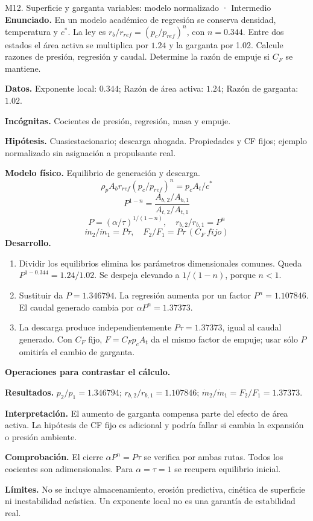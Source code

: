 \begin{studiumworked}{M12. Superficie y garganta variables: modelo normalizado · Intermedio}
\textbf{Enunciado.} En un modelo académico de regresión se conserva densidad, temperatura y $c^*$. La ley es $r_b/r_{ref}=(p_c/p_{ref})^n$, con $n=0.344$. Entre dos estados el área activa se multiplica por $1.24$ y la garganta por 1.02. Calcule razones de presión, regresión y caudal. Determine la razón de empuje si $C_F$ se mantiene.

\textbf{Datos.} Exponente local: $0.344$; Razón de área activa: $1.24$; Razón de garganta: $1.02$.

\textbf{Incógnitas.} Cocientes de presión, regresión, masa y empuje.

\textbf{Hipótesis.} Cuasiestacionario; descarga ahogada. Propiedades y CF fijos; ejemplo normalizado sin asignación a propulsante real.

\textbf{Modelo físico.} Equilibrio de generación y descarga.
\[\rho_pA_br_{ref}(p_c/p_{ref})^n=p_cA_t/c^*\]
\[P^{1-n}=\frac{A_{b,2}/A_{b,1}}{A_{t,2}/A_{t,1}}\]
\[P=(\alpha/\tau)^{1/(1-n)},\quad r_{b,2}/r_{b,1}=P^n\]
\[\dot m_2/\dot m_1=P\tau,\quad F_2/F_1=P\tau\ (C_F\ fijo)\]
\textbf{Desarrollo.}
\begin{enumerate}
\item Dividir los equilibrios elimina los parámetros dimensionales comunes. Queda $P^{1-0.344}=1.24/1.02$. Se despeja elevando a $1/(1-n)$, porque $n<1$.
\item Sustituir da $P=1.346794$. La regresión aumenta por un factor $P^n=1.107846$. El caudal generado cambia por $\alpha P^n=1.37373$.
\item La descarga produce independientemente $P\tau=1.37373$, igual al caudal generado. Con $C_F$ fijo, $F=C_Fp_cA_t$ da el mismo factor de empuje; usar sólo $P$ omitiría el cambio de garganta.
\end{enumerate}
\textbf{Operaciones para contrastar el cálculo.}

\textbf{Resultados.} $p_2/p_1=1.346794$; $r_{b,2}/r_{b,1}=1.107846$; $\dot m_2/\dot m_1=F_2/F_1=1.37373$.

\textbf{Interpretación.} El aumento de garganta compensa parte del efecto de área activa. La hipótesis de CF fijo es adicional y podría fallar si cambia la expansión o presión ambiente.

\textbf{Comprobación.} El cierre $\alpha P^n=P\tau$ se verifica por ambas rutas. Todos los cocientes son adimensionales. Para $\alpha=\tau=1$ se recupera equilibrio inicial.

\textbf{Límites.} No se incluye almacenamiento, erosión predictiva, cinética de superficie ni inestabilidad acústica. Un exponente local no es una garantía de estabilidad real.
\end{studiumworked}
